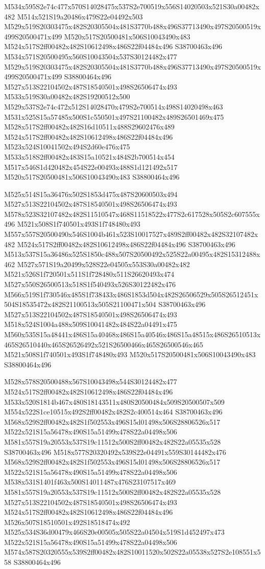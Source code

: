 \documentclass{article}
\begin{document}
\begin{multicols}{2}
M534x595S2e74c477x570S14028475x537S2e700519x556S14020503x521S30a00482x482 M514x521S19a20486x479S22e04492x503 M529x519S20303475x482S20305504x481S3770b488x496S37713490x497S20500519x499S20500471x499 M520x517S20500481x506S10043490x483 M524x517S2ff00482x482S10612498x486S22f04484x496 S38700463x496 M534x571S20500495x560S10043504x537S30124482x477 M529x519S20303475x482S20305504x481S3770b488x496S37713490x497S20500519x499S20500471x499 S38800464x496 M527x513S22104502x487S18540501x498S26506474x493 M533x519S30a00482x482S19200512x500 M529x537S2e74c472x512S14028470x479S2e700514x498S14020498x463 M531x525S15a57485x500S1c550501x497S21100482x489S26501469x475 M528x517S2ff00482x482S16d10511x488S29602476x489 M524x517S2ff00482x482S10612498x486S22f04484x496 M523x524S10041502x494S2d60e476x475 M533x518S2ff00482x483S15a10521x484S2b700514x454 M517x546S1d420482x454S22e00493x488S1d121492x517 M520x517S20500481x506S10043490x483 S38800464x496

M525x514S15a36476x502S1853d475x487S20600503x494 M527x513S22104502x487S18540501x498S26506474x493 M578x523S32107482x482S11510547x468S11518522x477S2c617528x505S2c607555x496 M521x508S1f740501x493S1f748480x493 M557x557S20500490x546S1004b461x523S10017527x489S2ff00482x482S32107482x482 M524x517S2ff00482x482S10612498x486S22f04484x496 S38700463x496 M513x537S15a36486x525S1850c488x507S20500492x525S22a00495x482S15312488x462 M527x571S19a20499x528S22e04505x553S30a00482x482 M521x526S1f720501x511S1f728480x511S26620493x474 M527x550S26500513x518S1f540493x526S30122482x476 M566x519S1f730546x485S1f738433x486S1853d504x482S26506529x505S26512451x504S18535472x482S21100513x505S21100471x504 S38700463x496 M527x513S22104502x487S18540501x498S26506474x493 M518x524S1004a488x509S10041482x484S22a04491x475 M560x535S15a48441x486S15a40468x486S15a40546x486S15a48515x486S26510513x465S26510440x465S26526492x521S26500466x465S26500546x465 M521x508S1f740501x493S1f748480x493 M520x517S20500481x506S10043490x483 S38800464x496

M528x578S20500488x567S10043498x544S30124482x477 M524x517S2ff00482x482S10612498x486S22f04484x496 M533x520S1814b467x480S18143511x480S20500484x509S20500507x509 M554x522S1ce10515x492S2ff00482x482S2c400514x464 S38700463x496 M568x529S2ff00482x482S1f502553x496S15d01498x506S28806526x517 M522x521S15a56478x490S15a51499x478S22a04498x506 M581x557S19a20553x537S19c11512x500S2ff00482x482S22a05535x528 S38700463x496 M518x577S20320492x539S22e04491x559S30144482x476 M568x529S2ff00482x482S1f502553x496S15d01498x506S28806526x517 M522x521S15a56478x490S15a51499x478S22a04498x506 M538x531S1401f463x500S14011487x476S23107517x469 M581x557S19a20553x537S19c11512x500S2ff00482x482S22a05535x528 M527x513S22104502x487S18540501x498S26506474x493 M524x517S2ff00482x482S10612498x486S22f04484x496 M526x507S18510501x492S18518474x492 M525x534S36d00479x466S20e00505x505S22a04504x519S1d452497x473 M522x521S15a56478x490S15a51499x478S22a04498x506 M574x587S20320555x539S2ff00482x482S10011520x502S22a05538x527S2e108551x558 S38800464x496


\end{multicols}
\end{document}
